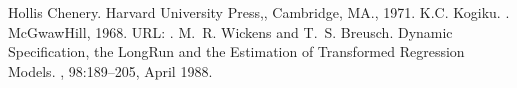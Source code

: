 \documentclass[letterpaper,10pt,english]{jupyterBook}
\begin{document}
\begin{sphinxthebibliography}{1}
\sphinxAtStartPar
Hollis Chenery.  Harvard University Press,, Cambridge, MA., 1971.
\sphinxAtStartPar
K.C. Kogiku. . McGwaw\sphinxhyphen{}Hill, 1968. URL: .
\sphinxAtStartPar
M. R. Wickens and T. S. Breusch. Dynamic Specification, the Long\sphinxhyphen{}Run and the Estimation of Transformed Regression Models. , 98:189–205, April 1988.
\end{sphinxthebibliography}







\renewcommand{\indexname}{Index}
\printindex
\end{document}
